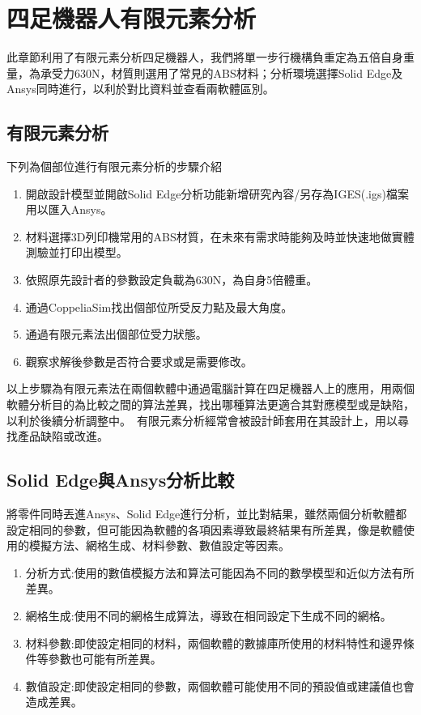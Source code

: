 \chapter{四足機器人有限元素分析}

此章節利用了有限元素分析四足機器人，我們將單一步行機構負重定為五倍自身重量，為承受力630N，材質則選用了常見的ABS材料；分析環境選擇Solid Edge及Ansys同時進行，以利於對比資料並查看兩軟體區別。\\

\section{有限元素分析}
下列為個部位進行有限元素分析的步驟介紹
\begin{enumerate}
\item 開啟設計模型並開啟Solid Edge分析功能新增研究內容/另存為IGES(.igs)檔案用以匯入Ansys。
\item 材料選擇3D列印機常用的ABS材質，在未來有需求時能夠及時並快速地做實體測驗並打印出模型。
\item 依照原先設計者的參數設定負載為630N，為自身5倍體重。
\item 通過CoppeliaSim找出個部位所受反力點及最大角度。
\item 通過有限元素法出個部位受力狀態。
\item 觀察求解後參數是否符合要求或是需要修改。\\

\end{enumerate}
以上步驟為有限元素法在兩個軟體中通過電腦計算在四足機器人上的應用，用兩個軟體分析目的為比較之間的算法差異，找出哪種算法更適合其對應模型或是缺陷，以利於後續分析調整中。\
有限元素分析經常會被設計師套用在其設計上，用以尋找產品缺陷或改進。\
\newpage
\section{Solid Edge與Ansys分析比較}
將零件同時丟進Ansys、Solid Edge進行分析，並比對結果，雖然兩個分析軟體都設定相同的參數，但可能因為軟體的各項因素導致最終結果有所差異，像是軟體使用的模擬方法、網格生成、材料參數、數值設定等因素。\

\begin{enumerate}
\item 分析方式:使用的數值模擬方法和算法可能因為不同的數學模型和近似方法有所差異。
\item 網格生成:使用不同的網格生成算法，導致在相同設定下生成不同的網格。
\item 材料參數:即使設定相同的材料，兩個軟體的數據庫所使用的材料特性和邊界條件等參數也可能有所差異。
\item	數值設定:即使設定相同的參數，兩個軟體可能使用不同的預設值或建議值也會造成差異。\\

\end{enumerate}

